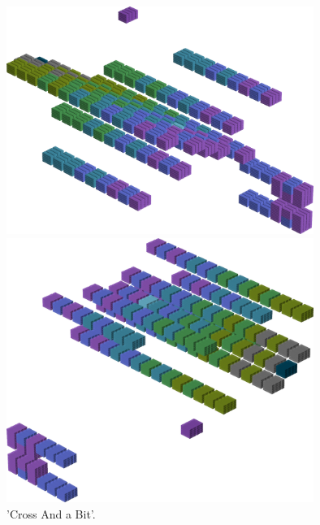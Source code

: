 \begin{minipage}[b]{0.48\linewidth}
\vspace{0.5cm}
\begin{figure}[H]
    \centering
    \begin{adjustbox}{width=5cm,margin=0cm 0cm}
      \includegraphics[width=10cm]{src/colorspace_patterns/pattern6-45.png}%
    \end{adjustbox}
    \begin{adjustbox}{width=5cm,margin=0cm 0cm}
      \includegraphics[width=10cm]{src/colorspace_patterns/pattern6-225.png}%
    \end{adjustbox}
\caption{'Cross And a Bit'.}
\end{figure}
\end{minipage}
